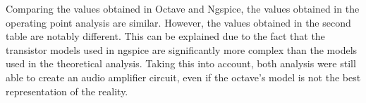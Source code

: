 \noindent Comparing the values obtained in Octave and Ngspice, the values obtained in the operating point analysis are similar. However, the values obtained in the second table are notably different. This can be explained due to the fact that the transistor models used in ngspice are significantly more complex than the models used in the theoretical analysis.
\noindent Taking this into account, both analysis were still able to create an audio amplifier circuit, even if the octave's model is not the best representation of the reality.

